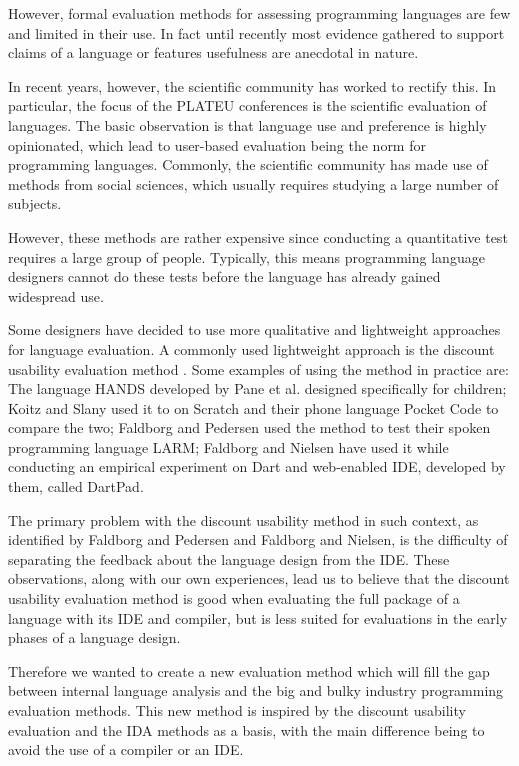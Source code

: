 \documentclass[preprint,10pt]{sigplanconf}
\begin{document}
However, formal evaluation methods for assessing programming languages are few and limited in their use. In fact until recently most evidence gathered to support claims of a language or features usefulness are anecdotal in nature\cite{StakingClaims}. 

In recent years, however, the scientific community has worked to rectify this.
In particular, the focus of the PLATEU conferences is the scientific evaluation of languages.
The basic observation is that language use and preference is highly opinionated, which lead to user-based evaluation being the norm for programming languages.
Commonly, the scientific community has made use of methods from social sciences, which usually requires studying a large number of subjects\cite{SocioPLT}\cite{AliceCS1}\cite{BlockOrNot}\cite{FromScratch}.

However, these methods are rather expensive since conducting a quantitative test requires a large group of people. Typically, this means programming language designers cannot do these tests before the language has already gained widespread use. 

Some designers have decided to use more qualitative and lightweight approaches for language evaluation. A commonly used lightweight approach is the discount usability evaluation method \cite{}. Some examples of using the method in practice are: The language HANDS developed by Pane et al.\cite{HANDS} designed specifically for children; Koitz and Slany\cite{PocketCode} used it to on Scratch and their phone language Pocket Code to compare the two; Faldborg and Pedersen used the method to test their spoken programming language LARM; Faldborg and Nielsen have used it while conducting an empirical experiment on Dart and web-enabled IDE, developed by them, called DartPad.\cite{}

The primary problem with the discount usability method in such context, as identified by Faldborg and Pedersen and Faldborg and Nielsen, is the difficulty of separating the feedback about the language design from the IDE.
These observations, along with our own experiences, lead us to believe that the discount usability evaluation method is good when evaluating the full package of a language with its IDE and compiler, but is less suited for evaluations in the early phases of a language design.

Therefore we wanted to create a new evaluation method which will fill the gap between 
internal language analysis and the big and bulky industry programming evaluation methods\cite{AliceCS1}\cite{BlockOrNot}\cite{FromScratch}. This new method is inspired by the discount usability evaluation and the IDA methods as a basis, with the main difference being to avoid the use of a compiler or an IDE. 
\end{document}
